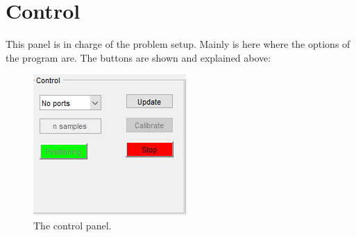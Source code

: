 \documentclass[a4paper, 21pt]{article} %
\begin{document}
\section{Control}
This panel is in charge of the problem setup. Mainly is here where the options of the program are. The buttons are shown and explained above:
\begin{figure}[!hbbp]
\begin{center}
\includegraphics[scale=1.3]{fig/ss_control.png}
\end{center}
\caption{The control panel.}
\end{figure}
\end{document}
